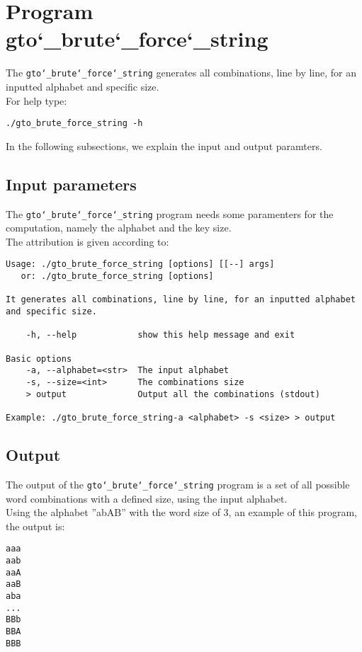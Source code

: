 \section{Program gto\char`_brute\char`_force\char`_string}
The \texttt{gto\char`_brute\char`_force\char`_string} generates all combinations, line by line, for an inputted alphabet and specific size.\\
For help type:
\begin{lstlisting}
./gto_brute_force_string -h
\end{lstlisting}
In the following subsections, we explain the input and output paramters.

\subsection*{Input parameters}

The \texttt{gto\char`_brute\char`_force\char`_string} program needs some paramenters for the computation, namely the alphabet and the key size.\\
The attribution is given according to:
\begin{lstlisting}
Usage: ./gto_brute_force_string [options] [[--] args]
   or: ./gto_brute_force_string [options]

It generates all combinations, line by line, for an inputted alphabet and specific size.

    -h, --help            show this help message and exit

Basic options
    -a, --alphabet=<str>  The input alphabet
    -s, --size=<int>      The combinations size
    > output              Output all the combinations (stdout)

Example: ./gto_brute_force_string-a <alphabet> -s <size> > output
\end{lstlisting}

\subsection*{Output}
The output of the \texttt{gto\char`_brute\char`_force\char`_string} program is a set of all possible word combinations with a defined size, using the input alphabet.\\
Using the alphabet ''abAB'' with the word size of 3, an example of this program, the output is:
\begin{lstlisting}
aaa
aab
aaA
aaB
aba
...
BBb
BBA
BBB
\end{lstlisting}